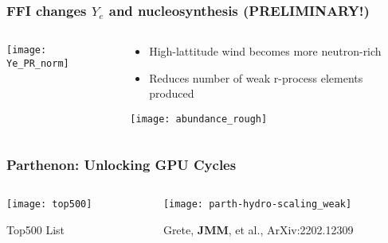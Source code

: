 \documentclass[]{beamer}
\begin{document}
\begin{frame}
  \frametitle{FFI changes $Y_e$ and nucleosynthesis (PRELIMINARY!)}
  \begin{columns}
    \begin{column}{4cm}
      \begin{center}
        \texttt{[image: Ye\_PR\_norm]}
      \end{center}
    \end{column}
    \begin{column}{8cm}
      \begin{itemize}
      \item High-lattitude wind becomes more neutron-rich
      \item Reduces number of weak r-process elements produced
      \end{itemize}
      \begin{center}
        \texttt{[image: abundance\_rough]}
      \end{center}
    \end{column}
  \end{columns}
\end{frame}

\begin{frame}
  \frametitle{Parthenon: Unlocking GPU Cycles}
  \begin{columns}
    \begin{column}{6cm}
      \begin{center}
        \texttt{[image: top500]}
      \end{center}
      {\footnotesize Top500 List}
    \end{column}
    \begin{column}{6cm}
      \begin{center}
        \texttt{[image: parth-hydro-scaling\_weak]}
      \end{center}
      {\footnotesize Grete, \textbf{JMM}, et al., ArXiv:2202.12309}
    \end{column}
  \end{columns}
\end{frame}
\end{document}

